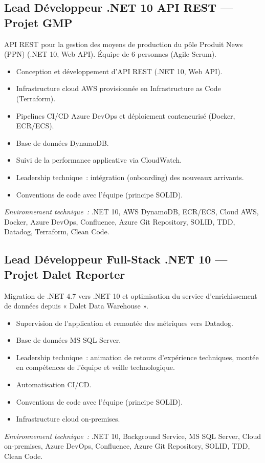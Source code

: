 \documentclass[10pt,a4paper]{article}
\begin{document}
\vspace{4pt}

\subsection*{Lead Développeur .NET 10 API REST --- Projet GMP}
\color{darkgray}
API REST pour la gestion des moyens de production du pôle Produit News (PPN) (.NET 10, Web API). Équipe de 6 personnes (Agile Scrum).
\begin{itemize}
  \item Conception et développement d'API REST (.NET 10, Web API).
  \item Infrastructure cloud AWS provisionnée en Infrastructure as Code (Terraform).
  \item Pipelines CI/CD Azure DevOps et déploiement conteneurisé (Docker, ECR/ECS).
  \item Base de données DynamoDB.
  \item Suivi de la performance applicative via CloudWatch.
  \item Leadership technique~: intégration (onboarding) des nouveaux arrivants.
  \item Conventions de code avec l'équipe (principe SOLID).
\end{itemize}
\textit{Environnement technique~:} .NET 10, AWS DynamoDB, ECR/ECS, Cloud AWS, Docker, Azure DevOps, Confluence, Azure Git Repository, SOLID, TDD, Datadog, Terraform, Clean Code.

\vspace{6pt}

\subsection*{Lead Développeur Full-Stack .NET 10 --- Projet Dalet Reporter}
\color{darkgray}
Migration de .NET 4.7 vers .NET 10 et optimisation du service d'enrichissement de données depuis « Dalet Data Warehouse ».
\begin{itemize}
  \item Supervision de l'application et remontée des métriques vers Datadog.
  \item Base de données MS SQL Server.
  \item Leadership technique~: animation de retours d'expérience techniques, montée en compétences de l'équipe et veille technologique.
  \item Automatisation CI/CD.
  \item Conventions de code avec l'équipe (principe SOLID).
  \item Infrastructure cloud on-premises.
\end{itemize}
\textit{Environnement technique~:} .NET 10, Background Service, MS SQL Server, Cloud on-premises, Azure DevOps, Confluence, Azure Git Repository, SOLID, TDD, Clean Code.
\end{document}
